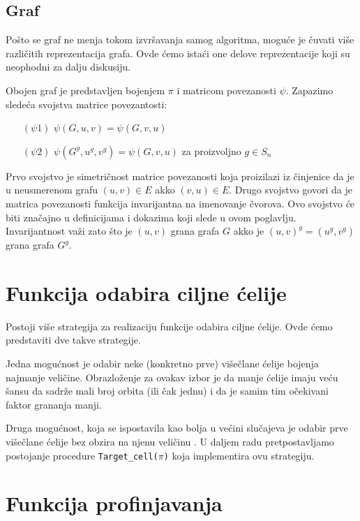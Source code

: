 \documentclass[12pt,oneside]{memoir}
\theoremstyle{definition}
\begin{document}
  \subsection{Graf}

   Pošto se graf ne menja tokom izvršavanja samog algoritma, moguće je čuvati
   više različitih reprezentacija grafa. Ovde ćemo istaći one delove
   reprezentacije koji su neophodni za dalju diskusiju.

   Obojen graf je predstavljen bojenjem $\pi$ i matricom povezanosti $\psi$.
   Zapazimo sledeća svojstva matrice povezantosti:
   \begin{itemize}
	   \item[$(\psi1)$] $\psi(G, u, v) = \psi(G, v, u)$
	   \item[$(\psi2)$] $\psi(G^g, u^g, v^g) = \psi(G, v, u)$ za proizvoljno $g \in S_n$
   \end{itemize}
   Prvo svojstvo je simetričnost matrice povezanosti koja proizilazi iz
   činjenice da je u neusmerenom grafu $(u, v) \in E$ akko $(v, u) \in E$.
   Drugo svojstvo govori da je matrica povezanosti funkcija invarijantna na
   imenovanje čvorova. Ovo svojstvo će biti značajno u definicijama i dokazima
   koji slede u ovom poglavlju. Invarijantnost važi zato što je $(u, v)$ grana
   grafa $G$ akko je $(u, v)^g = (u^g, v^g)$ grana grafa $G^g$.

 \section{Funkcija odabira ciljne ćelije}

 Postoji više strategija za realizaciju funkcije odabira ciljne ćelije. Ovde
 ćemo predstaviti dve takve strategije.

 Jedna mogućnost je odabir neke (konkretno prve) višečlane ćelije bojenja
 najmanje veličine. Obrazloženje za ovakav izbor je da manje ćelije imaju veću
 šansu da sadrže mali broj orbita (ili čak jednu) \cite{McKay} i da je samim
 tim očekivani faktor grananja manji.

 Druga mogućnost, koja se ispostavila kao bolja u većini slučajeva je odabir
 prve višečlane ćelije bez obzira na njenu veličinu \cite{McKay}. U daljem radu
 pretpostavljamo postojanje procedure \texttt{Target\_cell($\pi$)} koja
 implementira ovu strategiju.

 \pagebreak

 \section{Funkcija profinjavanja}
\end{document}
